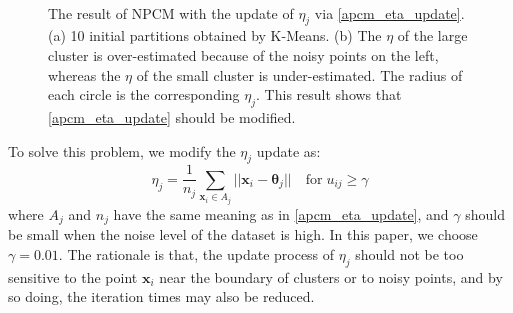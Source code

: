 \documentclass[conference]{IEEEtran}
\theoremstyle{definition}
\begin{document}
\begin{figure}[tb]
\captionsetup[subfloat]{farskip=1pt,captionskip=1pt}%
   \centering
    \\
\caption{The result of NPCM with the update of $\eta_j$ via \eqref{apcm_eta_update}. (a) 10 initial partitions obtained by K-Means. (b) The $\eta$ of the large cluster is over-estimated because of the noisy points on the left, whereas the $\eta$ of the small cluster is under-estimated. The radius of each circle is the corresponding $\eta_j$. This result shows that \eqref{apcm_eta_update} should be modified.}
\label{fig_eta}
\end{figure}
To solve this problem, we modify the $\eta_j$ update as:
\begin{equation}
\label{npcm_eta_update}
\eta_j=\frac{1}{n_j}\sum_{\mathbf{x}_i\in A_j}||\mathbf{x}_i-\boldsymbol{\theta}_j|| \quad \text{for}\;u_{ij} \geq \gamma
\end{equation}
where $A_j$ and $n_j$ have the same meaning as in \eqref{apcm_eta_update}, and $\gamma$ should be small when the noise level of the dataset is high. In this paper, we choose $\gamma=0.01$. The rationale is that, the update process of $\eta_j$ should not be too sensitive to the point $\mathbf{x}_i$ near the boundary of clusters or to noisy points, and by so doing, the iteration times may also be reduced.
\end{document}
